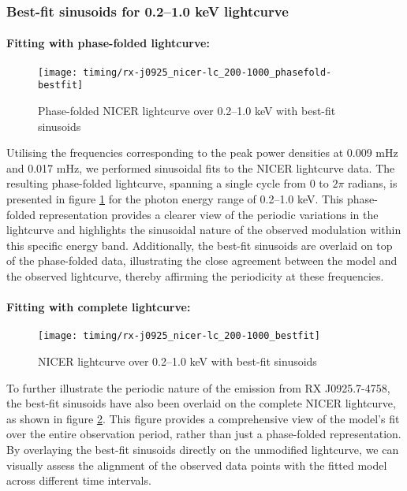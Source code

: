			\subsubsection{Best-fit sinusoids for 0.2--1.0 keV lightcurve}
				\paragraph{Fitting with phase-folded lightcurve:}
				\begin{figure}[h!]
					\centering
					\texttt{[image: timing/rx-j0925\_nicer-lc\_200-1000\_phasefold-bestfit]}
					\caption{Phase-folded NICER lightcurve over 0.2--1.0 keV with best-fit sinusoids}
					\label{result:lc-phase-fold-mrvel-nicer:200-1000-bestfit}
				\end{figure}
				Utilising the frequencies corresponding to the peak power densities at 0.009 mHz and 0.017 mHz, we performed sinusoidal fits to the NICER lightcurve data. The resulting phase-folded lightcurve, spanning a single cycle from 0 to $2\pi$ radians, is presented in figure \ref{result:lc-phase-fold-mrvel-nicer:200-1000-bestfit} for the photon energy range of 0.2--1.0 keV. This phase-folded representation provides a clearer view of the periodic variations in the lightcurve and highlights the sinusoidal nature of the observed modulation within this specific energy band. Additionally, the best-fit sinusoids are overlaid on top of the phase-folded data, illustrating the close agreement between the model and the observed lightcurve, thereby affirming the periodicity at these frequencies.
				
				\paragraph{Fitting with complete lightcurve:}
				\begin{figure}[h!]
					\centering
					\texttt{[image: timing/rx-j0925\_nicer-lc\_200-1000\_bestfit]}
					\caption{NICER lightcurve over 0.2--1.0 keV with best-fit sinusoids}
					\label{result:lc-mrvel-nicer:200-1000-bestfit}
				\end{figure}
				To further illustrate the periodic nature of the emission from RX J0925.7-4758, the best-fit sinusoids have also been overlaid on the complete NICER lightcurve, as shown in figure \ref{result:lc-mrvel-nicer:200-1000-bestfit}. This figure provides a comprehensive view of the model's fit over the entire observation period, rather than just a phase-folded representation. By overlaying the best-fit sinusoids directly on the unmodified lightcurve, we can visually assess the alignment of the observed data points with the fitted model across different time intervals.
				
